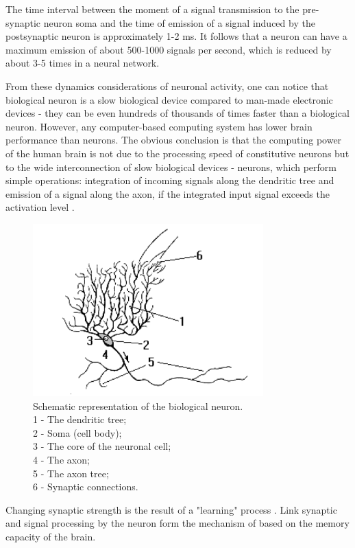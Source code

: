 The time interval between the moment of a signal transmission to the pre-synaptic neuron soma and the time of emission of a signal induced by the postsynaptic neuron is approximately 1-2 ms. It follows that a neuron can have a maximum emission of about 500-1000 signals per second, which is reduced by about 3-5 times in a neural network.

From these dynamics considerations of neuronal activity, one can notice that biological neuron is a slow biological device compared to man-made electronic devices - they can be even hundreds of thousands of times faster than a biological neuron. However, any computer-based computing system has lower brain performance than neurons. The obvious conclusion is that the computing power of the human brain is not due to the processing speed of constitutive neurons but to the wide interconnection of slow biological devices - neurons, which perform simple operations: integration of incoming signals along the dendritic tree and emission of a signal along the axon, if the integrated input signal exceeds the activation level \cite{calculNeuronal}.

\begin{figure}[H]
  \centering
  \includegraphics[width=3.5in]{images/neuronulBiologic.png}
  \caption {
      Schematic representation of the biological neuron.\\ 
      1 - The dendritic tree;\\ 
      2 - Soma (cell body);\\ 
      3 - The core of the neuronal cell;\\ 
      4 - The axon;\\ 
      5 - The axon tree;\\ 
      6 - Synaptic connections.
  }
\end{figure}

Changing synaptic strength is the result of a "learning" process \cite{calculNeuronal}. Link synaptic and signal processing by the neuron form the mechanism of based on the memory capacity of the brain.